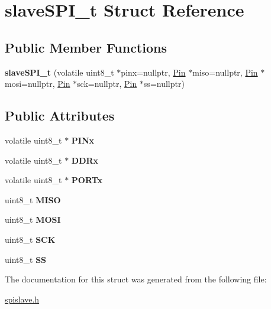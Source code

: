 \hypertarget{structslaveSPI__t}{}\section{slave\+S\+P\+I\+\_\+t Struct Reference}
\label{structslaveSPI__t}
\subsection*{Public Member Functions}
\begin{DoxyCompactItemize}
\item 
\mbox{\label{structslaveSPI__t_a1b6a92bfd0ff9f66643a2216703070fe}} 
{\bfseries slave\+S\+P\+I\+\_\+t} (volatile uint8\+\_\+t $\ast$pinx=nullptr, \hyperlink{classPin}{Pin} $\ast$miso=nullptr, \hyperlink{classPin}{Pin} $\ast$mosi=nullptr, \hyperlink{classPin}{Pin} $\ast$sck=nullptr, \hyperlink{classPin}{Pin} $\ast$ss=nullptr)
\end{DoxyCompactItemize}
\subsection*{Public Attributes}
\begin{DoxyCompactItemize}
\item 
\mbox{\label{structslaveSPI__t_a87109c268334437e6c10cde1a0ba03af}} 
volatile uint8\+\_\+t $\ast$ {\bfseries P\+I\+Nx}
\item 
\mbox{\label{structslaveSPI__t_a77665ecee539253948fc71839bc554e7}} 
volatile uint8\+\_\+t $\ast$ {\bfseries D\+D\+Rx}
\item 
\mbox{\label{structslaveSPI__t_a5588c63730f0f979979505bc9fd9c549}} 
volatile uint8\+\_\+t $\ast$ {\bfseries P\+O\+R\+Tx}
\item 
\mbox{\label{structslaveSPI__t_ad9840e1a743e4e44ceb98423dbf9e187}} 
uint8\+\_\+t {\bfseries M\+I\+SO}
\item 
\mbox{\label{structslaveSPI__t_afa1934adc11d621b99622b2c3d64f39c}} 
uint8\+\_\+t {\bfseries M\+O\+SI}
\item 
\mbox{\label{structslaveSPI__t_a9806668f14328150edfee7d9c9c50c16}} 
uint8\+\_\+t {\bfseries S\+CK}
\item 
\mbox{\label{structslaveSPI__t_a784ce6629767e64b0bbe7ffcf2937d52}} 
uint8\+\_\+t {\bfseries SS}
\end{DoxyCompactItemize}


The documentation for this struct was generated from the following file\+:\begin{DoxyCompactItemize}
\item 
\hyperlink{spislave_8h}{spislave.\+h}\end{DoxyCompactItemize}
